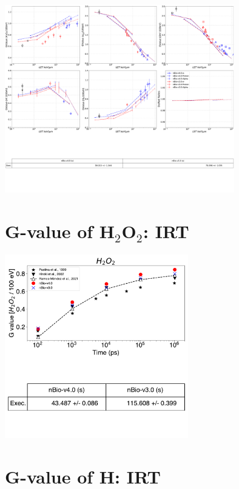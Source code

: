 \documentclass[aspectratio=1610]{beamer}
\begin{document}
\begin{frame}{\secname}
 \centering
  \includegraphics[width=0.75\textwidth]{./Gvalue_LET-IRT/Gvalue_LET-IRT}
\end{frame}

\section{G-value of H$_2$O$_2$: IRT}

\begin{frame}{\secname}
 \centering
  \includegraphics[width=0.6\textwidth]{./GvalueIRT_H2O2/TimeEvolution}
\end{frame}

\section{G-value of H: IRT}
\end{document}
